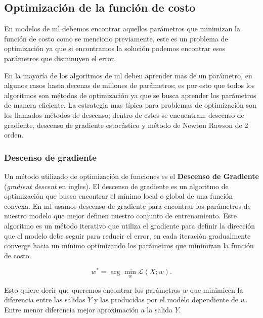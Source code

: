 
\subsection{Optimización de la función de costo} 
En modelos de \ac{ml} debemos encontrar aquellos parámetros que minimizan la función de costo como se menciono previamente, este es un problema de optimización ya que si encontramos la solución podemos encontrar esos parámetros que disminuyen el error.

En la mayoría de los algoritmos de \ac{ml} deben aprender mas de un parámetro, en algunos casos hasta decenas de millones de parámetros; es por esto que todos los algoritmos  son métodos de optimización ya que se busca aprender los parámetros de manera eficiente. La estrategia mas típica para problemas de optimización son los llamados métodos de descenso; dentro de estos se encuentran: descenso de gradiente, descenso de gradiente estocástico y método de Newton Rawson de 2 orden.

\subsubsection{Descenso de gradiente}\label{sub:gradient-desc}
Un método utilizado de optimización de funciones  es el \textbf{Descenso de Gradiente} (\textit{gradient descent} en ingles). El descenso de gradiente es un algoritmo de optimización que busca encontrar el mínimo local o global de una función convexa.  En \ac{ml} usamos descenso de gradiente para encontrar los parámetros de nuestro modelo que mejor definen nuestro conjunto de entrenamiento. Este algoritmo es un método iterativo que utiliza el gradiente para definir la dirección que el modelo debe seguir para reducir el error, en cada iteración gradualmente converge hacia un mínimo optimizando los parámetros que minimizan la función de costo. 


\begin{equation}
w^* =  \arg\min_{w} \mathcal{L}(X; w).
\end{equation}

Esto quiere decir que queremos encontrar los parámetros $w$ que minimicen la diferencia entre las salidas $Y$ y las producidas por el modelo dependiente de $w$. Entre menor  diferencia mejor aproximación a la salida $Y$. 

